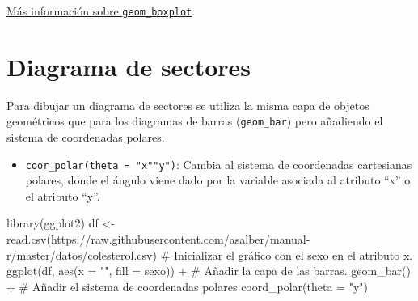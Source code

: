 \documentclass[
  a4paper,
]{scrreport}
\newenvironment{Shaded}{\begin{snugshade}}{\end{snugshade}}
\newcommand{\AttributeTok}[1]{\textcolor[rgb]{0.40,0.45,0.13}{#1}}
\newcommand{\CommentTok}[1]{\textcolor[rgb]{0.37,0.37,0.37}{#1}}
\newcommand{\FunctionTok}[1]{\textcolor[rgb]{0.28,0.35,0.67}{#1}}
\newcommand{\NormalTok}[1]{\textcolor[rgb]{0.00,0.23,0.31}{#1}}
\newcommand{\OtherTok}[1]{\textcolor[rgb]{0.00,0.23,0.31}{#1}}
\newcommand{\SpecialCharTok}[1]{\textcolor[rgb]{0.37,0.37,0.37}{#1}}
\newcommand{\StringTok}[1]{\textcolor[rgb]{0.13,0.47,0.30}{#1}}
\providecommand{\tightlist}{%
  \setlength{\itemsep}{0pt}\setlength{\parskip}{0pt}}\usepackage{longtable,booktabs,array}
\theoremstyle{definition}
\theoremstyle{definition}
\theoremstyle{remark}
\begin{document}
\href{https://ggplot2.tidyverse.org/reference/geom_boxplot.html}{Más
información sobre \texttt{geom\_boxplot}}.

\hypertarget{diagrama-de-sectores}{%
\section{Diagrama de sectores}\label{diagrama-de-sectores}}

Para dibujar un diagrama de sectores se utiliza la misma capa de objetos
geométricos que para los diagramas de barras (\texttt{geom\_bar}) pero
añadiendo el sistema de coordenadas polares.

\begin{itemize}
\tightlist
\item
  \texttt{coor\_polar(theta\ =\ "x"\textbar{}"y")}: Cambia al sistema de
  coordenadas cartesianas polares, donde el ángulo viene dado por la
  variable asociada al atributo ``x'' o el atributo ``y''.
\end{itemize}

\begin{Shaded}
\begin{Highlighting}[]
\FunctionTok{library}\NormalTok{(ggplot2)}
\NormalTok{df }\OtherTok{\textless{}{-}} \FunctionTok{read.csv}\NormalTok{(}\StringTok{\textquotesingle{}https://raw.githubusercontent.com/asalber/manual{-}r/master/datos/colesterol.csv\textquotesingle{}}\NormalTok{)}
\CommentTok{\# Inicializar el gráfico con el sexo en el atributo x.}
\FunctionTok{ggplot}\NormalTok{(df, }\FunctionTok{aes}\NormalTok{(}\AttributeTok{x =} \StringTok{""}\NormalTok{, }\AttributeTok{fill =}\NormalTok{ sexo)) }\SpecialCharTok{+}
\CommentTok{\# Añadir la capa de las barras.}
    \FunctionTok{geom\_bar}\NormalTok{() }\SpecialCharTok{+}
\CommentTok{\# Añadir el sistema de coordenadas polares}
    \FunctionTok{coord\_polar}\NormalTok{(}\AttributeTok{theta =} \StringTok{"y"}\NormalTok{)}
\end{Highlighting}
\end{Shaded}
\end{document}
